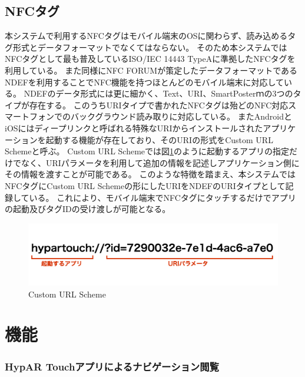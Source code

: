 \subsection{NFCタグ}
本システムで利用するNFCタグはモバイル端末のOSに関わらず、読み込めるタグ形式とデータフォーマットでなくてはならない。
そのため本システムではNFCタグとして最も普及しているISO/IEC 14443 TypeAに準拠したNFCタグを利用している。
また同様にNFC FORUMが策定したデータフォーマットであるNDEFを利用することでNFC機能を持つほとんどのモバイル端末に対応している。
NDEFのデータ形式には更に細かく、Text、URI、SmartPosterｍの3つのタイプが存在する。
このうちURIタイプで書かれたNFCタグは殆どのNFC対応スマートフォンでのバックグラウンド読み取りに対応している。
またAndroidとiOSにはディープリンクと呼ばれる特殊なURIからインストールされたアプリケーションを起動する機能が存在しており、そのURIの形式をCustom URL Schemeと呼ぶ。
Custom URL Schemeでは図\ref{fig:custom_url_scheme}のように起動するアプリの指定だけでなく、URIパラメータを利用して追加の情報を記述しアプリケーション側にその情報を渡すことが可能である。
このような特徴を踏まえ、本システムではNFCタグにCustom URL Schemeの形にしたURIをNDEFのURIタイプとして記録している。
これにより、モバイル端末でNFCタグにタッチするだけでアプリの起動及びタグIDの受け渡しが可能となる。

\begin{figure}[h]
  \centering
  \includegraphics[width=150mm]{images/custom_url_scheme.jpg}
  \caption{Custom URL Scheme} \label{fig:custom_url_scheme}
\end{figure}




\section{機能}

\subsubsection{HypAR Touchアプリによるナビゲーション閲覧}
